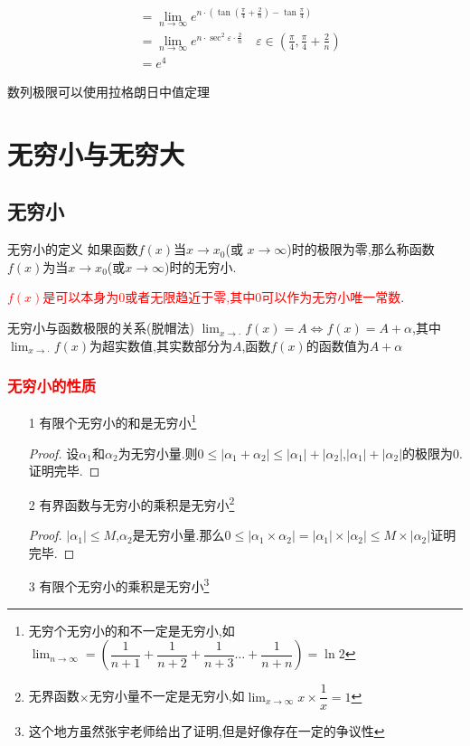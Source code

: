\documentclass[8pt a4paper, oneside, UTF8]{ctexbook}
\begin{document}
\begin{sloppypar}
\begin{solution}
\begin{align*}
                      & = \lim_{n\to\infty}e^{n\cdot (\tan(\frac{\pi}{4}+\frac{2}{n}) -\tan \frac{\pi}{4})}                                                \\
                      & = \lim_{n\to\infty}e^{n \cdot \sec^2 \varepsilon \cdot \frac{2}{n}} \quad \varepsilon \in(\frac{\pi}{4},\frac{\pi}{4}+\frac{2}{n}) \\
                      & =e^4
        \end{align*}
    \end{solution}
    \begin{note}
        数列极限可以使用拉格朗日中值定理
    \end{note}
    \section{无穷小与无穷大}
    \subsection{无穷小}
    \begin{defn}{无穷小的定义}{}
        如果函数$f(x)$当$x\to x_0$(或 $x\to\infty$)时的极限为零,那么称函数$f(x)$为当$x\to x_0$(或$x\to\infty$)时的无穷小.
    \end{defn}
    \textcolor{red}{$f(x)$是可以本身为$0$或者无限趋近于零,其中$0$可以作为无穷小唯一常数}.
    \begin{criterion}{无穷小与函数极限的关系(脱帽法)}{}
        $\lim_{x\to\cdot}f(x)=A\Leftrightarrow f(x)=A+\alpha$,其中$\lim_{x\to\cdot}f(x)$为超实数值,其实数部分为$A$,函数$f(x)$的函数值为$A+\alpha$\label{wqx1}
    \end{criterion}
    \subsubsection{\textcolor{red}{无穷小的性质}}
    \begin{itemize}
        \item[1] 有限个无穷小的和是无穷小\footnote{无穷个无穷小的和不一定是无穷小,如$\lim_{n \to \infty}=(\dfrac{1}{n+1}+\dfrac{1}{n+2}+\dfrac{1}{n+3}\dots +\dfrac{1}{n+n})=\ln 2$}
            \begin{proof}
                设$\alpha_1$和$\alpha_2$为无穷小量.则$0 \leqslant |\alpha_1+\alpha_2|\leqslant |\alpha_1|+|\alpha_2|$,$|\alpha_1|+|\alpha_2|$的极限为0.证明完毕.
            \end{proof}
        \item[2] 有界函数与无穷小的乘积是无穷小\footnote{无界函数$\times$无穷小量不一定是无穷小,如$\lim_{x \to \infty}x \times \dfrac{1}{x}=1$}
            \begin{proof}
                $|\alpha _1|\leqslant M$,$\alpha_2$是无穷小量.那么$0\leqslant|\alpha_1 \times \alpha_2|=|\alpha_1|\times |\alpha_2|\leqslant M \times |\alpha_2|$证明完毕.
            \end{proof}
        \item[3] 有限个无穷小的乘积是无穷小\footnote{这个地方虽然张宇老师给出了证明,但是好像存在一定的争议性}
    \end{itemize}

\end{sloppypar}
\end{document}
